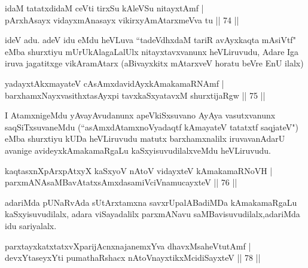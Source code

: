 
\begin{shl}
idaM tatatxdidaM ceVti tirxSu kAleVSu nitayxtAmf |\\
pArxhAsayx vidayxmAnasayx vikirxyAmAtarxmeVva tu \hfill || 74 ||
\end{shl}

\begin{artha}
ideV adu. adeV idu eMdu heVLuva ``tadeVdhxdaM tariR avAyxkaqta mAsiVtf" eMba shurxtiyu mUrUkAlagaLalUlx nitayxtavxvanunx heVLiruvudu, Adare Iga iruva jagatitxge vikAramAtarx (aBivayxkitx mAtarxveV horatu beVre EnU ilalx)
\end{artha}

\begin{shl}
yadayxtAkxmayateV cAsAmxdavidAyxkAmakamaRNAmf |\\
barxhamxNayxvasithxtasAyxpi tavxkaSxyatavxM shurxtijaRgw \hfill || 75 ||
\end{shl}

\begin{artha}
I AtamxnigeMdu yAvayAvudanunx apeVkiSxsuvano AyAya vasutxvanunx saqSiTxsuvaneMdu (``asAmxdAtamxnoVyadaqtf kAmayateV tatatxtf saqjateV") eMba shurxtiyu kUDa heVLiruvudu matutx barxhamxnalilx iruvavanAdarU avanige avideyxkAmakamaRgaLu kaSxyisuvudilalxveMdu heVLiruvudu.
\end{artha}


\begin{shl}
kaqtasxnXpArxpAtxyX kaSxyoV nAtoV vidayxteV kAmakamaRNoVH |\\
parxmANAsaMBavAtatxsAmxdasamiVciVnamucayxteV \hfill || 76 ||
\end{shl}

\begin{artha}
adariMda pUNaRvAda sUtArxtamxna savxrUpalABadiMDa kAmakamaRgaLu kaSxyisuvudilalx, adara viSayadalilx parxmANavu saMBavisuvudilalx,adariMda idu sariyalalx.
\end{artha}


\begin{shl}
parxtayxkatxtatxvXparijAcnxnajanemxYva dhavxMsaheVtutAmf |\\
devxYtaseyxYti pumathaRshacx nAtoV\s nayxtikxMcidiSayxteV \hfill || 78 ||
\end{shl}

